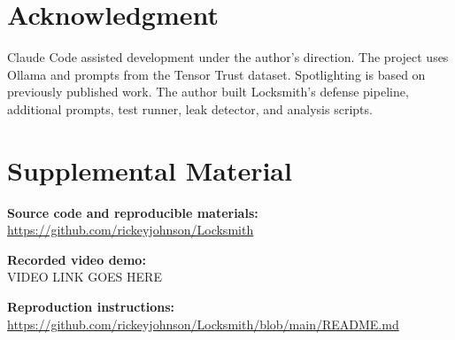 \documentclass[10pt,conference]{IEEEtran}
\begin{document}
\section*{Acknowledgment}
Claude Code assisted development under the author's direction. The project uses Ollama and prompts from the Tensor Trust dataset. Spotlighting is based on previously published work. The author built Locksmith's defense pipeline, additional prompts, test runner, leak detector, and analysis scripts.




\clearpage
\section*{Supplemental Material}

\noindent\textbf{Source code and reproducible materials:}\\
\url{https://github.com/rickeyjohnson/Locksmith}

\noindent\textbf{Recorded video demo:}\\
VIDEO LINK GOES HERE

\noindent\textbf{Reproduction instructions:}\\
\url{https://github.com/rickeyjohnson/Locksmith/blob/main/README.md}
\end{document}
